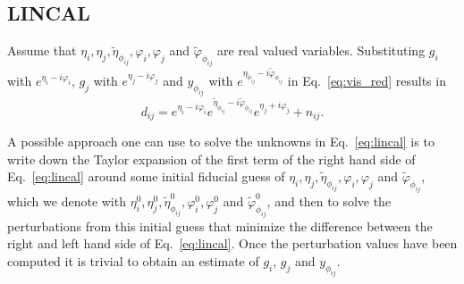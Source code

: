 \documentclass[useAMS,usenatbib]{mn2e}
\begin{document}
\subsection{LINCAL}
Assume that $\eta_i,\eta_j,\widetilde{\eta}_{\phi_{ij}},\varphi_i,\varphi_j$ and $\widetilde{\varphi}_{\phi_{ij}}$ are real valued variables.
Substituting $g_i$ with $e^{\eta_i - i \varphi_i}$, $g_j$ with $e^{\eta_j - i \varphi_j}$ and $y_{\phi_{ij}}$ with $e^{\eta_{\widetilde{\phi}_{ij}}- i \widetilde{\varphi}_{\phi_{ij}}}$ in Eq.~\eqref{eq:vis_red} results in  
\begin{equation}
\label{eq:lincal}
d_{ij} =  e^{\eta_i - i \varphi_i} e^{\widetilde{\eta}_{\phi_{ij}}- i \widetilde{\varphi}_{\phi_{ij}}} e^{\eta_j + i \varphi_j} + n_{ij}.
\end{equation}

A possible approach one can use to solve the unknowns in Eq.~\eqref{eq:lincal} is to write down the Taylor expansion of the first term of the right hand side of Eq.~\eqref{eq:lincal} around some 
initial fiducial guess of $\eta_i,\eta_j,\widetilde{\eta}_{\phi_{ij}},\varphi_i,\varphi_j$ and $\widetilde{\varphi}_{\phi_{ij}}$, which we denote with 
$\eta_i^0,\eta_j^0,\widetilde{\eta}_{\phi_{ij}}^0,\varphi_i^0,\varphi_j^0$ and $\widetilde{\varphi}_{\phi_{ij}}^0$, and then to solve the perturbations from this 
initial guess that minimize the difference between the right and left hand side of Eq.~\eqref{eq:lincal}. Once the perturbation values 
have been computed it is trivial to obtain an estimate of $g_i$, $g_j$ and $y_{\phi_{ij}}$. 
\end{document}
